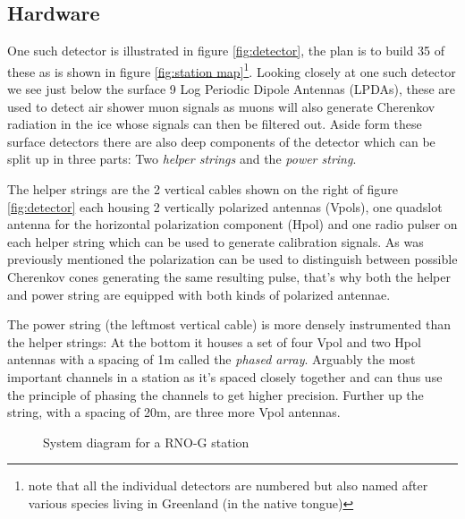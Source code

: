 \subsection{Hardware}
One such detector is illustrated in figure \ref{fig:detector}, the plan is to
build 35 of these as is shown in figure \ref{fig:station map}\footnote{note
that all the individual detectors are numbered but also named after various species living in
Greenland (in the native tongue)}. Looking closely at one such detector we see
just below the surface 9 Log Periodic Dipole Antennas (LPDAs), these are used
to detect air shower muon signals as muons will also generate Cherenkov
radiation in the ice whose signals can then be filtered out.  Aside form these
surface detectors there are also deep components of the detector which can be
split up in three parts: Two \textit{helper strings} and the \textit{power
string}.

The helper strings are the 2 vertical cables shown on the right of figure
\ref{fig:detector} each housing 2 vertically polarized antennas (Vpols), one
quadslot antenna for the horizontal polarization component (Hpol) and one radio
pulser on each helper string which can be used to generate calibration signals.
As was previously mentioned the polarization can be used to
distinguish between possible Cherenkov cones generating the same resulting
pulse, that's why both the helper and power string are equipped with both kinds
of polarized antennae.

The power string (the leftmost vertical cable) is more densely instrumented
than the helper strings: At the bottom it houses a set of four Vpol and two
Hpol antennas with a spacing of 1m called the \textit{phased array}. Arguably
the most important channels in a station as it's spaced closely together and
can thus use the principle of phasing the channels to get higher precision.
Further up the string, with a spacing of 20m, are three more Vpol antennas.
\begin{figure}
  \centering
  \caption{System diagram for a RNO-G station}
  \label{fig:SysDiag}
\end{figure}


